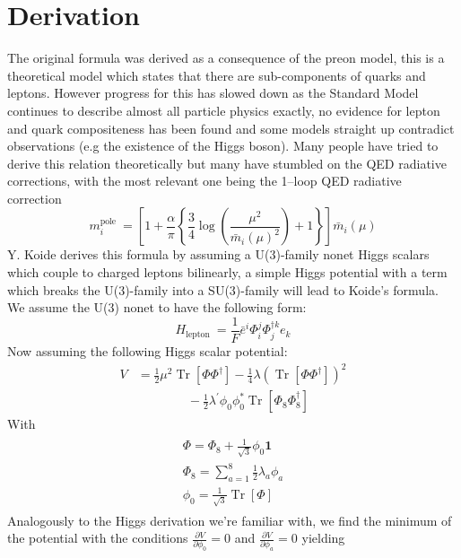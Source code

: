 \documentclass[twoside,twocolumn,11pt]{article} %
\begin{document}
\section{Derivation}
The original formula was derived as a consequence of the preon model, this is a theoretical model which states that there are sub-components of quarks and leptons. However progress for this has slowed down as the Standard Model continues to describe almost all particle physics exactly, no evidence for lepton and quark compositeness has been found and some models straight up contradict observations (e.g the existence of the Higgs boson). Many people have tried to derive this relation theoretically but many have stumbled on the QED radiative corrections, with the most relevant one being the 1–loop QED radiative correction
\begin{equation*}
	m_{i}^{\text {pole }}=\left[1+\frac{\alpha}{\pi}\left\{\frac{3}{4} \log \left(\frac{\mu^{2}}{\bar{m}_{i}(\mu)^{2}}\right)+1\right\}\right] \bar{m}_{i}(\mu)
\end{equation*}
Y. Koide \cite{1990Koide} derives this formula by assuming a U(3)-family nonet Higgs scalars which couple to charged leptons bilinearly, a simple Higgs potential with a term which breaks the U(3)-family into a SU(3)-family will lead to Koide's formula. We assume the U(3) nonet to have the following form:
\begin{equation}
	H_{\text {lepton }}=\frac{1}{F} \bar{e}^{i} \Phi_{i}^{j} \Phi_{j}^{\dagger k} e_{k}\label{eq:nonet}
\end{equation}
Now assuming the following Higgs scalar potential:
\begin{align*}
	V&=\frac{1}{2} \mu^{2} \operatorname{Tr}\left[\Phi \Phi^{\dagger}\right]-\frac{1}{4} \lambda\left(\operatorname{Tr}\left[\Phi \Phi^{\dagger}\right]\right)^{2}\\&\qquad\qquad-\frac{1}{2} \lambda^{\prime} \phi_{0} \phi_{0}^{*} \operatorname{Tr}\left[\Phi_{8} \Phi_{8}^{\dagger}\right]
\end{align*}
With
\begin{align}
	\begin{gathered}
		\Phi=\Phi_{8}+\frac{1}{\sqrt{3}} \phi_{0} \boldsymbol{1} \\
		\Phi_{8}=\sum_{a=1}^{8} \frac{1}{2} \lambda_{a} \phi_{a} \\
		\phi_{0}=\frac{1}{\sqrt{3}} \operatorname{Tr}[\Phi]
	\end{gathered}
\end{align}
Analogously to the Higgs derivation we're familiar with, we find the minimum of the potential with the conditions $\frac{\partial V}{\partial \phi_0}=0$ and $\frac{\partial V}{\partial \phi_a}=0$ yielding
\end{document}
